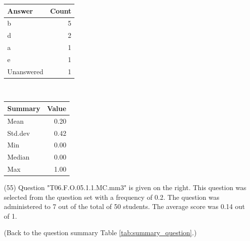 \documentclass[12pt,english,nohyper]{tufte-handout}\usepackage[]{graphicx}\usepackage[]{color}
\begin{document}
\begin{center}%
\begin{tabular}{lr}
  \hline
Answer & Count \\ 
  \hline
b &   5 \\ 
  d &   2 \\ 
  a &   1 \\ 
  e &   1 \\ 
  Unanswered &   1 \\ 
   \hline
\end{tabular}
~~~~~~~~%
\begin{tabular}{lr}
  \hline
Summary & Value \\ 
  \hline
Mean & 0.20 \\ 
  Std.dev & 0.42 \\ 
  Min & 0.00 \\ 
  Median & 0.00 \\ 
  Max & 1.00 \\ 
   \hline
\end{tabular}
\end{center}\newpage{} (55) Question "T06.F.O.05.1.1.MC.mm3" is given on the right. This question was selected from the question set with a frequency of 0.2. The question was administered to 7 out of the total of 50 students. The average score was 0.14 out of 1.

 (Back to the question summary Table \ref{tab:summary_question}.)
\end{document}
